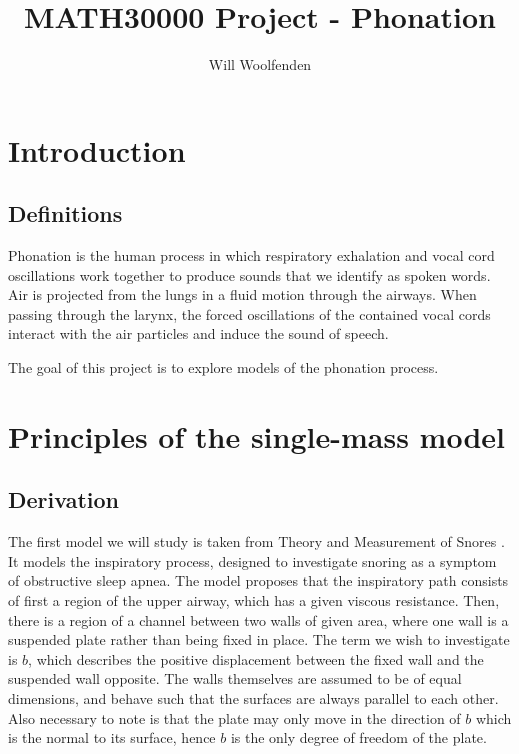 \documentclass{article}
\title{MATH30000 Project - Phonation}
\author{Will Woolfenden}
\begin{document}
\maketitle

\section{Introduction}

\subsection{Definitions}

Phonation is the human process in which respiratory exhalation and vocal cord oscillations work together to produce sounds that we identify as spoken words.
Air is projected from the lungs in a fluid motion through the airways.
When passing through the larynx, the forced oscillations of the contained vocal cords interact with the air particles and induce the sound of speech.

The goal of this project is to explore models of the phonation process.



\section{Principles of the single-mass model}

\subsection{Derivation}

The first model we will study is taken from Theory and Measurement of Snores \cite{gavriely_jensen_1993}.
It models the inspiratory process, designed to investigate snoring as a symptom of obstructive sleep apnea.
The model proposes that the inspiratory path consists of first a region of the upper airway,
which has a given viscous resistance.
Then, there is a region of a channel between two walls of given area, where one wall is a suspended plate rather than being fixed in place.
The term we wish to investigate is $b$, which describes the positive displacement between the fixed wall and the suspended wall opposite.
The walls themselves are assumed to be of equal dimensions, and behave such that the surfaces are always parallel to each other.
Also necessary to note is that the plate may only move in the direction of $b$ which is the normal to its surface,
hence $b$ is the only degree of freedom of the plate.
\end{document}
